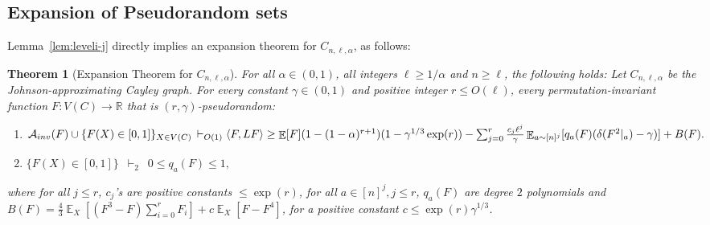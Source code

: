 \documentclass[11pt]{article}
\DeclareMathOperator*{\E}{\mathbb{E}}
\DeclarePairedDelimiter\ip{\langle}{\rangle}
\def \R {\mathbb{R}}
\def \cA {\mathcal{A}}
\newtheorem{theorem}{Theorem}[section]
\theoremstyle{definition}
\begin{document}
\subsection{Expansion of Pseudorandom sets}
Lemma~\ref{lem:leveli-j} directly implies an expansion theorem for $C_{n,\ell,\alpha}$, as follows:
\begin{theorem}[Expansion Theorem for $C_{n,\ell,\alpha}$]\label{thm:structure-johnson-cayley}
For all $\alpha \in (0,1)$, all integers $\ell \geq 1/\alpha$ and $n \geq \ell$, the following holds: Let $C_{n,\ell,\alpha}$ be the Johnson-approximating Cayley graph. For every constant $\gamma \in (0,1)$ and positive integer $r \leq O(\ell)$, every permutation-invariant function $F: V(C) \rightarrow \R$ that is $(r,\gamma)$-pseudorandom:
\begin{enumerate}
\item $\cA_{inv}(F) \cup \{F(X) \in [0,1]\}_{X \in V(C)} \, \vdash_{O(1)}\, \\
\ip{F, LF} \geq \E[F](1 - (1-\alpha)^{r+1})(1- \gamma^{1/3}\exp(r)) - \sum_{j = 0}^r \frac{ c_j\ell^{j}}{\gamma}\E_{a \sim [n]^{j}}[q_a(F)({\delta(F^{ 2}|_a) - \gamma)}] + B(F).$
\item $\{F(X) \in [0,1]\} \,\,\, \vdash_{2} \,\,\, 0 \leq q_a(F) \leq 1,$
\end{enumerate}
where for all $j \leq r$, $c_j$'s are positive constants $\leq \exp(r)$, for all $a \in [n]^j, j \leq r$, $q_a(F)$ are degree $2$  polynomials and $B(F) = \frac{4}{3}\E_X[(F^{ 3} - F)\sum_{i = 0}^r F_i] + c\E_X[F - F^{ 4}]$, for a positive constant $c \leq \exp(r)\gamma^{1/3}$.
\end{theorem}
\end{document}
